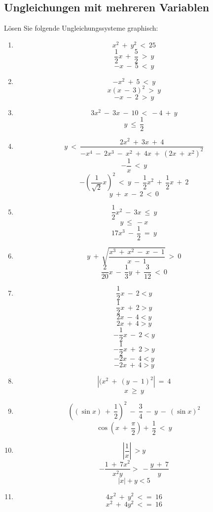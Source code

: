 \subsection{Ungleichungen mit mehreren Variablen}

Lösen Sie folgende Ungleichungssysteme graphisch:

\begin{enumerate}
\item
\[x^2 \ + \ y^2 \ < \ 25 \]
\[\frac 1 2 x \ + \ \frac 5 2 \ > \ y \]
\[-x \ - \ 5 \ < \ y \]

\item
\[- x^2 \ + \ 5 \ < \ y \]
\[x(x \ - \ 3)^2 \ > \ y \]
\[-x \ - \ 2 \ > \ y \]

\item
\[3x^2 \ - \ 3x \ - \ 10 \ < \ -4 \ + \ y \]
\[y \ \leq \ \frac 1 2 \]

\item
\[ y \ < \ \frac {2x^2 \ + \ 3x \ + \ 4} {- x^4 \ - \ 2x^3 \ - \ x^2 \ + \ 4x \ + \ (2x \ + \ x^2)^2} \]
\[- \frac 1 x \ < \ y \]
\[- ( \frac 1 {\sqrt 2} x )^2 \ < \ y \ - \ \frac 1 2 x^2 \ + \ \frac 1 2 x \ + \ 2 \]
\[y \ + \ x \ - \ 2 \ < \ 0 \]

\item
\[\frac 1 2 x^2 \ - \ 3x \ \leq \ y\]
\[y \ \leq \ -x\]
\[17x^3 \ - \ \frac 1 2 \ = \ y\]

\item
\[ y \ + \ \sqrt {\frac {x^3 \ + \ x^2 \ - \ x \ - \ 1} {x \ - \ 1}} \ > \ 0 \]
\[ \frac 2 {20} x \ - \ \frac 1 3 y \ + \ \frac 3 {12} \ < \ 0\]

\item
\[\frac 1 2 x \ - \ 2 < y\]
\[\frac 1 2 x \ + \ 2 > y\]
\[2 x \ - \ 4 < y\]
\[2 x \ + \ 4 > y\]
\[- \frac 1 2 x \ - \ 2 < y\]
\[- \frac 1 2 x \ + \ 2 > y\]
\[-2 x \ - \ 4 < y\]
\[-2 x \ + \ 4 > y\]

\item
\[|(x^2 \ + \ (y \ - \ 1)^2| \ = \ 4 \]
\[x \ \geq \ y \]

\item
\[((\sin x) \ + \ \frac 1 2)^2 \ - \ \frac 3 4 \ - \ y \ - \ (\sin x)^2 \]
\[\cos (x \ + \ \frac {\pi} 2 ) + \ \frac 1 2 \ < \ y \]

\item
\[| \frac 1 x| \ > y \]
\[- \frac {1 \ + \ 7x^2} {x^2 y} > \ - \frac {y \ + \ 7} y\]
\[|x| + y < 5\]

\item
\[4x^2 \ + \ y^2 \ <= \ 16\]
\[x^2 \ + \ 4y^2 \ <= \ 16\]


\end{enumerate}

